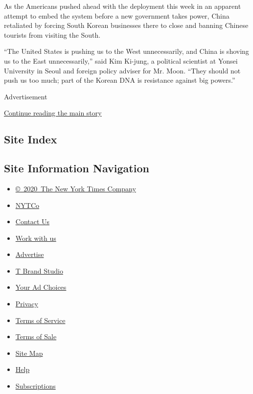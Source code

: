 As the Americans pushed ahead with the deployment this week in an
apparent attempt to embed the system before a new government takes
power, China retaliated by forcing South Korean businesses there to
close and banning Chinese tourists from visiting the South.

``The United States is pushing us to the West unnecessarily, and China
is shoving us to the East unnecessarily,'' said Kim Ki-jung, a political
scientist at Yonsei University in Seoul and foreign policy adviser for
Mr. Moon. ``They should not push us too much; part of the Korean DNA is
resistance against big powers.''

Advertisement

\protect\hyperlink{after-bottom}{Continue reading the main story}

\hypertarget{site-index}{%
\subsection{Site Index}\label{site-index}}

\hypertarget{site-information-navigation}{%
\subsection{Site Information
Navigation}\label{site-information-navigation}}

\begin{itemize}
\tightlist
\item
  \href{https://help.nytimes.com/hc/en-us/articles/115014792127-Copyright-notice}{©~2020~The
  New York Times Company}
\end{itemize}

\begin{itemize}
\tightlist
\item
  \href{https://www.nytco.com/}{NYTCo}
\item
  \href{https://help.nytimes.com/hc/en-us/articles/115015385887-Contact-Us}{Contact
  Us}
\item
  \href{https://www.nytco.com/careers/}{Work with us}
\item
  \href{https://nytmediakit.com/}{Advertise}
\item
  \href{http://www.tbrandstudio.com/}{T Brand Studio}
\item
  \href{https://www.nytimes.com/privacy/cookie-policy\#how-do-i-manage-trackers}{Your
  Ad Choices}
\item
  \href{https://www.nytimes.com/privacy}{Privacy}
\item
  \href{https://help.nytimes.com/hc/en-us/articles/115014893428-Terms-of-service}{Terms
  of Service}
\item
  \href{https://help.nytimes.com/hc/en-us/articles/115014893968-Terms-of-sale}{Terms
  of Sale}
\item
  \href{https://spiderbites.nytimes.com}{Site Map}
\item
  \href{https://help.nytimes.com/hc/en-us}{Help}
\item
  \href{https://www.nytimes.com/subscription?campaignId=37WXW}{Subscriptions}
\end{itemize}
